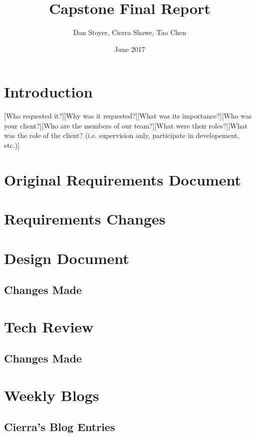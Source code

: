 \documentclass{article}
\title{Capstone Final Report}
\author{Dan Stoyer, Cierra Shawe, Tao Chen }
\date{June 2017}
\begin{document}
\maketitle

\section{Introduction}
[Who requested it?][Why was it requested?][What was its importance?][Who was your client?][Who are the members of our team?][What were their roles?][What was the role of the client? (i.e. supervision only, participate in developement, etc.)]

\section{Original Requirements Document}

\section{Requirements Changes}

\section{Design Document}

    \subsection{Changes Made}

\section{Tech Review}

    \subsection{Changes Made}

\section{Weekly Blogs}

\subsection{Cierra's Blog Entries}
\end{document}
